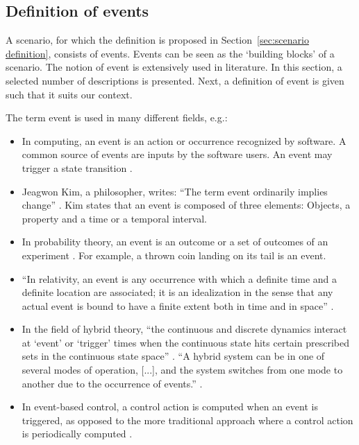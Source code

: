 \subsection{Definition of events}
\label{sec:events}
A scenario, for which the definition is proposed in Section~\ref{sec:scenario definition}, consists of events. Events can be seen as the `building blocks' of a scenario. The notion of event is extensively used in literature. In this section, a selected number of descriptions is presented. Next, a definition of event is given such that it suits our context.

The term event is used in many different fields, e.g.:
\begin{itemize}
	\item In computing, an event is an action or occurrence recognized by software. A common source of events are inputs by the software users. An event may trigger a state transition \cite{breu1997towards}.
	\item Jeagwon Kim, a philosopher, writes: ``The term event ordinarily implies change'' \cite{kim1993supervenience}. Kim states that an event is composed of three elements: Objects, a property and a time or a temporal interval. 
	\item In probability theory, an event is an outcome or a set of outcomes of an experiment \cite{pfeiffer2013concepts}. For example, a thrown coin landing on its tail is an event.
	\item ``In relativity, an event is any occurrence with which a definite time and a definite location are associated; it is an idealization in the sense that any actual event is bound to have a finite extent both in time and in space'' \cite{sartori1996understanding}.
	\item In the field of hybrid theory, ``the continuous and discrete dynamics interact at `event' or `trigger' times when the continuous state hits certain prescribed sets in the continuous state space'' \cite{branicky1998hybridcontrol}. ``A hybrid system can be in one of several modes of operation, [...], and the system switches from one mode to another due to the occurrence of events.'' \cite{boel1999hybridcontrol}.
	\item In event-based control, a control action is computed when an event is triggered, as opposed to the more traditional approach where a control action is periodically computed \cite{heemels2012eventcontrol}. 
\end{itemize}

